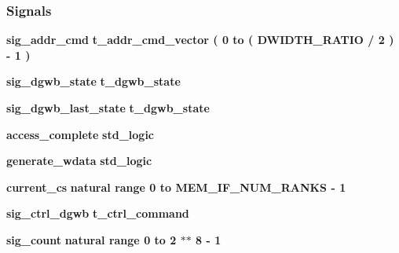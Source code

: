 \subsubsection*{Signals}
 \begin{DoxyCompactItemize}
\item 
{\bf sig\+\_\+addr\+\_\+cmd} {\bfseries {\bfseries {\bf t\+\_\+addr\+\_\+cmd\+\_\+vector}} \textcolor{vhdlchar}{ }\textcolor{vhdlchar}{(}\textcolor{vhdlchar}{ }\textcolor{vhdlchar}{ } \textcolor{vhdldigit}{0} \textcolor{vhdlchar}{ }\textcolor{keywordflow}{to}\textcolor{vhdlchar}{ }\textcolor{vhdlchar}{(}\textcolor{vhdlchar}{ }\textcolor{vhdlchar}{ }\textcolor{vhdlchar}{ }\textcolor{vhdlchar}{ }{\bfseries {\bf D\+W\+I\+D\+T\+H\+\_\+\+R\+A\+T\+IO}} \textcolor{vhdlchar}{/}\textcolor{vhdlchar}{ } \textcolor{vhdldigit}{2} \textcolor{vhdlchar}{ }\textcolor{vhdlchar}{)}\textcolor{vhdlchar}{ }\textcolor{vhdlchar}{-\/}\textcolor{vhdlchar}{ } \textcolor{vhdldigit}{1} \textcolor{vhdlchar}{ }\textcolor{vhdlchar}{)}\textcolor{vhdlchar}{ }} 
\item 
{\bf sig\+\_\+dgwb\+\_\+state} {\bfseries {\bfseries {\bf t\+\_\+dgwb\+\_\+state}} \textcolor{vhdlchar}{ }} 
\item 
{\bf sig\+\_\+dgwb\+\_\+last\+\_\+state} {\bfseries {\bfseries {\bf t\+\_\+dgwb\+\_\+state}} \textcolor{vhdlchar}{ }} 
\item 
{\bf access\+\_\+complete} {\bfseries \textcolor{comment}{std\+\_\+logic}\textcolor{vhdlchar}{ }} 
\item 
{\bf generate\+\_\+wdata} {\bfseries \textcolor{comment}{std\+\_\+logic}\textcolor{vhdlchar}{ }} 
\item 
{\bf current\+\_\+cs} {\bfseries \textcolor{comment}{natural}\textcolor{vhdlchar}{ }\textcolor{vhdlchar}{ }\textcolor{vhdlchar}{ }\textcolor{keywordflow}{range}\textcolor{vhdlchar}{ }\textcolor{vhdlchar}{ } \textcolor{vhdldigit}{0} \textcolor{vhdlchar}{ }\textcolor{keywordflow}{to}\textcolor{vhdlchar}{ }\textcolor{vhdlchar}{ }\textcolor{vhdlchar}{ }\textcolor{vhdlchar}{ }{\bfseries {\bf M\+E\+M\+\_\+\+I\+F\+\_\+\+N\+U\+M\+\_\+\+R\+A\+N\+KS}} \textcolor{vhdlchar}{-\/}\textcolor{vhdlchar}{ } \textcolor{vhdldigit}{1} \textcolor{vhdlchar}{ }} 
\item 
{\bf sig\+\_\+ctrl\+\_\+dgwb} {\bfseries {\bfseries {\bf t\+\_\+ctrl\+\_\+command}} \textcolor{vhdlchar}{ }} 
\item 
{\bf sig\+\_\+count} {\bfseries \textcolor{comment}{natural}\textcolor{vhdlchar}{ }\textcolor{vhdlchar}{ }\textcolor{vhdlchar}{ }\textcolor{keywordflow}{range}\textcolor{vhdlchar}{ }\textcolor{vhdlchar}{ } \textcolor{vhdldigit}{0} \textcolor{vhdlchar}{ }\textcolor{keywordflow}{to}\textcolor{vhdlchar}{ }\textcolor{vhdlchar}{ } \textcolor{vhdldigit}{2} \textcolor{vhdlchar}{$\ast$}\textcolor{vhdlchar}{$\ast$}\textcolor{vhdlchar}{ } \textcolor{vhdldigit}{8} \textcolor{vhdlchar}{-\/}\textcolor{vhdlchar}{ } \textcolor{vhdldigit}{1} \textcolor{vhdlchar}{ }} 
\end{DoxyCompactItemize}


